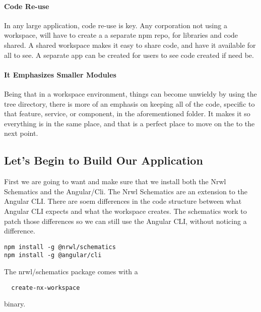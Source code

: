 \paragraph{Code Re-use}
In any large application, code re-use is key. Any corporation not using a
workspace, will have to create a a separate npm repo, for libraries and code
shared. A shared workspace makes it easy to share code, and have it available
for all to see. A separate app can be created for users to see code created if
need be.

\paragraph{It Emphasizes Smaller Modules}
Being that in a workspace environment, things can become unwieldy by using the
tree directory, there is more of an emphasis on keeping all of the code,
specific to that feature, service, or component, in the aforementioned folder.
It makes it so everything is in the same place, and that is a perfect place to
move on the to the next point.

\subsection{Let's Begin to Build Our Application}

First we are going to want and make sure that we install both the Nrwl Schematics
and the Angular/Cli. The Nrwl Schematics are an extension to the Angular CLI.
There are soem differences in the code structure between what Angular CLI expects
and what the workspace creates. The schematics work to patch those differences
so we can still use the Angular CLI, without noticing a difference.

\begin{verbatim}
npm install -g @nrwl/schematics
npm install -g @angular/cli
\end{verbatim}

The nrwl/schematics package comes with a
\newcommand{\code}[1]{\texttt{hello}}
\begin{verbatim}
  create-nx-workspace
\end{verbatim}
binary.
